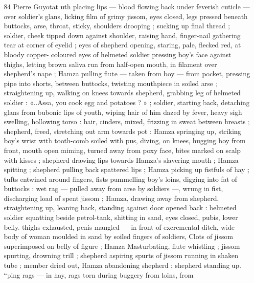 84 Pierre Guyotat
uth placing lips — blood flowing back under feverish cuticle —
over soldier's glans, licking film of grimy jissom, eyes closed, legs
pressed beneath buttocks, arse, throat, sticky, shoulders drooping ;
sucking up final thread ; soldier, cheek tipped down against shoulder,
raising hand, finger-nail gathering tear at corner of eyelid ; eyes of
shepherd opening, staring, pale, flecked red, at bloody copper-
coloured eyes of helmeted soldier pressing boy's face against
thighs, letting brown saliva run from half-open mouth, in filament
over shepherd's nape ; Hamza pulling flute — taken from boy —
from pocket, pressing pipe into shorts, between buttocks, twisting
mouthpiece in soiled arse ; straightening up, walking on knees
towards shepherd, grabbing leg of helmeted soldier : «..Assa, you
cook egg and potatoes ? » ; soldier, starting back, detaching glans
from bubonic lips of youth, wiping hair of him dazed by fever, heavy
sigh swelling, hollowing torso : hair, cinders, mixed, frizzing in sweat
between breasts ; shepherd, freed, stretching out arm towards pot :
Hamza springing up, striking boy's wrist with tooth-comb soiled with
pus, diving, on knees, hugging boy from front, mouth open miming,
turned away from poxy face, bites marked on scalp with kisses ;
shepherd drawing lips towards Hamza’s slavering mouth ; Hamza
spitting ; shepherd pulling back spattered lips ; Hamza picking up
fistfuls of hay ; tufts entwined around fingers, fists pummelling boy's
loins, digging into fat of buttocks : wet rag — pulled away from arse
by soldiers —, wrung in fist, discharging load of spent jissom ;
Hamza, drawing away from shepherd, straightening up, leaning back,
standing against door opened back : helmeted soldier squatting
beside petrol-tank, shitting in sand, eyes closed, pubis, lower belly.
thighs exhausted, penis mangled — in front of excremental ditch,
wide body of woman moulded in sand by soiled fingers of soldiers,
Clots of jissom superimposed on belly of figure ; Hamza
Masturbating, flute whistling ; jissom spurting, drowning trill ;
shepherd aspiring spurts of jissom running in shaken tube ; member
dried out, Hamza abandoning shepherd ; shepherd standing up.
“ping rags — in hay, rags torn during buggery from loins, from

